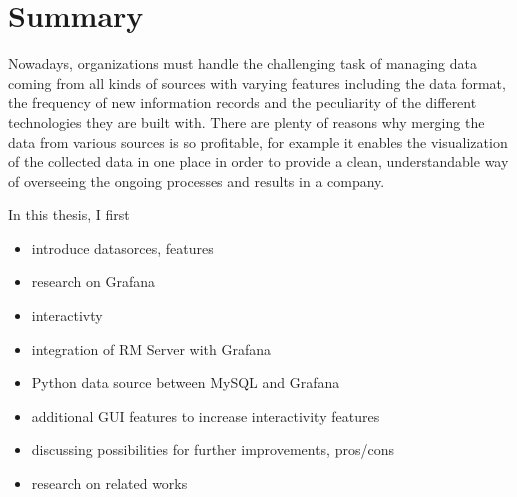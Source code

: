 \chapter{Summary}

Nowadays, organizations must handle the challenging task of managing data coming from all kinds of sources with varying features including the data format, the frequency of new information records and the peculiarity of the different technologies they are built with. There are plenty of reasons why merging the data from various sources is so profitable, for example it enables the visualization of the collected data in one place in order to provide a clean, understandable way of overseeing the ongoing processes and results in a company.

In this thesis, I first 



\begin{itemize}
	\item introduce datasorces, features
	\item research on Grafana
	\item interactivty
	\item integration of RM Server with Grafana
	\item Python data source between MySQL and Grafana
	\item additional GUI features to increase interactivity features
	\item discussing possibilities for further improvements, pros/cons
	\item research on related works
\end{itemize}

